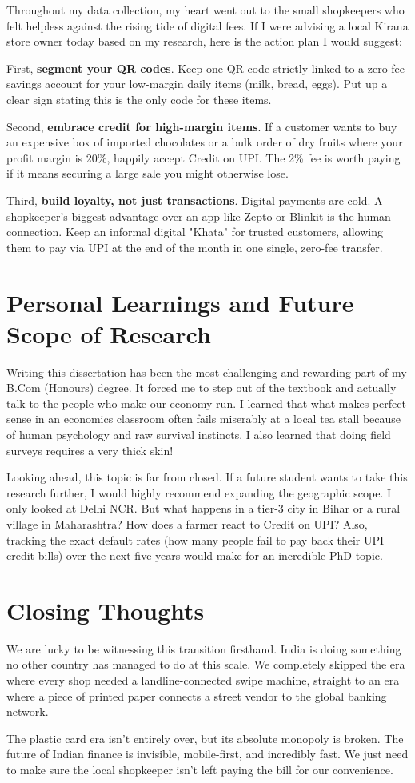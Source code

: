 Throughout my data collection, my heart went out to the small shopkeepers who felt helpless against the rising tide of digital fees. If I were advising a local Kirana store owner today based on my research, here is the action plan I would suggest:

First, \textbf{segment your QR codes}. Keep one QR code strictly linked to a zero-fee savings account for your low-margin daily items (milk, bread, eggs). Put up a clear sign stating this is the only code for these items.

Second, \textbf{embrace credit for high-margin items}. If a customer wants to buy an expensive box of imported chocolates or a bulk order of dry fruits where your profit margin is 20\%, happily accept Credit on UPI. The 2\% fee is worth paying if it means securing a large sale you might otherwise lose.

Third, \textbf{build loyalty, not just transactions}. Digital payments are cold. A shopkeeper's biggest advantage over an app like Zepto or Blinkit is the human connection. Keep an informal digital "Khata" for trusted customers, allowing them to pay via UPI at the end of the month in one single, zero-fee transfer.

\section{Personal Learnings and Future Scope of Research}

Writing this dissertation has been the most challenging and rewarding part of my B.Com (Honours) degree. It forced me to step out of the textbook and actually talk to the people who make our economy run. I learned that what makes perfect sense in an economics classroom often fails miserably at a local tea stall because of human psychology and raw survival instincts. I also learned that doing field surveys requires a very thick skin!

Looking ahead, this topic is far from closed. If a future student wants to take this research further, I would highly recommend expanding the geographic scope. I only looked at Delhi NCR. But what happens in a tier-3 city in Bihar or a rural village in Maharashtra? How does a farmer react to Credit on UPI? Also, tracking the exact default rates (how many people fail to pay back their UPI credit bills) over the next five years would make for an incredible PhD topic.

\section{Closing Thoughts}

We are lucky to be witnessing this transition firsthand. India is doing something no other country has managed to do at this scale. We completely skipped the era where every shop needed a landline-connected swipe machine, straight to an era where a  piece of printed paper connects a street vendor to the global banking network.

The plastic card era isn't entirely over, but its absolute monopoly is broken. The future of Indian finance is invisible, mobile-first, and incredibly fast. We just need to make sure the local shopkeeper isn't left paying the bill for our convenience.